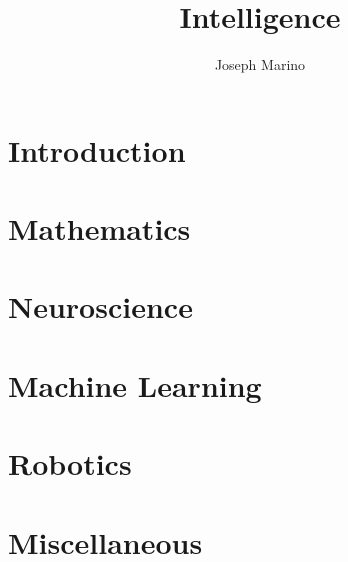 \documentclass[11pt,fancychapters]{report}
\title{Intelligence}
\author{Joseph Marino}
\begin{document}
\maketitle
{}
\newpage
{}
\tableofcontents
\newpage
{}



\part{Introduction}



\part{Mathematics}







\part{Neuroscience}






\part{Machine Learning}






\part{Robotics}

\part{Miscellaneous}




\appendix

\end{document}
